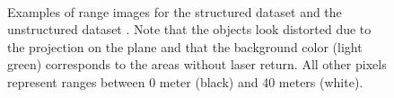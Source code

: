 \begin{figure}[H]
    \centering
    \\
    \caption{Examples of range images for the structured dataset \protect{} and the unstructured dataset \protect{}. Note that the objects look distorted due to the projection on the plane and that the background color (light green) corresponds to the areas without laser return. All other pixels represent ranges between 0 meter (black) and 40 meters (white).}
    \label{fig:chap_slam_range}
\end{figure}


